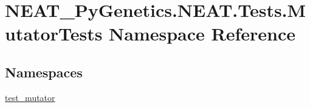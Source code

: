 \hypertarget{namespaceNEAT__PyGenetics_1_1NEAT_1_1Tests_1_1MutatorTests}{}\section{N\+E\+A\+T\+\_\+\+Py\+Genetics.\+N\+E\+A\+T.\+Tests.\+Mutator\+Tests Namespace Reference}
\label{namespaceNEAT__PyGenetics_1_1NEAT_1_1Tests_1_1MutatorTests}
\subsection*{Namespaces}
\begin{DoxyCompactItemize}
\item 
 \hyperlink{namespaceNEAT__PyGenetics_1_1NEAT_1_1Tests_1_1MutatorTests_1_1test__mutator}{test\+\_\+mutator}
\end{DoxyCompactItemize}

